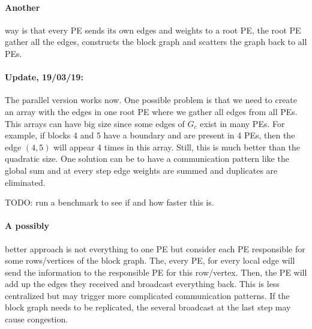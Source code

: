 \documentclass[a4paper,10pt]{article}
\begin{document}
\paragraph*{Another} way is that every PE sends its own edges and weights to a root PE, the root PE gather all the
edges, constructs the block graph and scatters the graph back to all PEs.

\paragraph*{Update, 19/03/19:} The parallel version works now. One possible problem is that we need to create
an array with the edges in one root PE where we gather all edges from all PEs. This arrays can have 
big size since some edges of $G_c$ exist in many PEs. For example, if blocks 4 and 5 have a boundary 
and are present in 4 PEs, then the edge $(4,5)$ will appear 4 times in this array. Still, this
is much better than the quadratic size. One solution can be to have a communication pattern like
the global sum and at every step edge weights are summed and duplicates are eliminated.

TODO: run a benchmark to see if and how faster this is.

\paragraph*{A possibly} better approach is not everything to one PE but consider each PE responsible
for some rows/vertices of the block graph. The, every PE, for every local edge will send the information 
to the responsible PE for this row/vertex. Then, the PE will add up the edges they received and
broadcast everything back. This is less centralized but may trigger more complicated communication 
patterns. If the block graph needs to be replicated, the several broadcast at the last step may
cause congestion.
\end{document}
